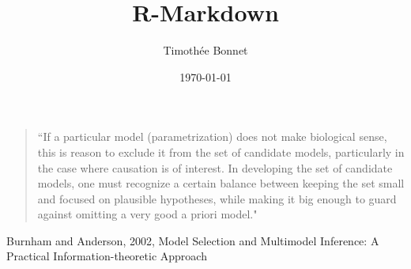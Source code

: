 \documentclass[10pt]{beamer}\usepackage[]{graphicx}\usepackage[]{color}
\title{R-Markdown}
\author{Timoth\'ee Bonnet}
\institute{BDSI / RSB}
\date{\today}
\begin{document}
\begin{frame}
  \begin{quote}
  ``If a particular model (parametrization) does not make biological sense,
this is reason to exclude it from the set of candidate models, particularly
in the case where causation is of interest. In developing the set of candidate
models, one must recognize a certain balance between keeping the set small
and focused on plausible hypotheses, while making it big enough to guard
against omitting a very good a priori model."
  \end{quote}

Burnham and Anderson, 2002, Model Selection and Multimodel Inference: A Practical Information-theoretic Approach

\end{frame}

\begin{frame}
\maketitle
\end{frame}
\end{document}
